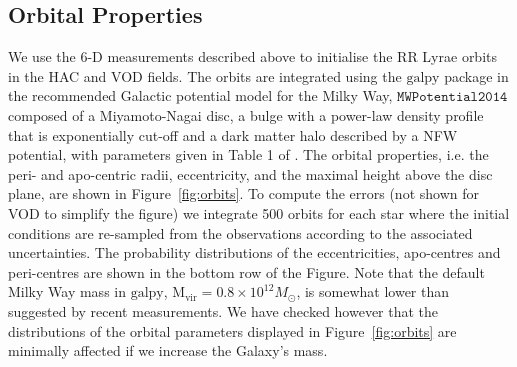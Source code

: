 \documentclass[fleqn,usenatbib]{mnras}
\begin{document}
\subsection{Orbital Properties}
We use the 6-D measurements described above to initialise the RR Lyrae
orbits in the HAC and VOD fields. The orbits are integrated using the
$\mathrm{galpy}$ package \citep{Bovy2015} in the recommended Galactic
potential model for the Milky Way, $\texttt{MWPotential2014}$ composed
of a Miyamoto-Nagai disc, a bulge with a power-law density profile
that is exponentially cut-off and a dark matter halo described by a
NFW potential, with parameters given in Table 1 of
\citet{Bovy2015}. The orbital properties, i.e. the peri- and
apo-centric radii, eccentricity, and the maximal height above the disc
plane, are shown in Figure~\ref{fig:orbits}. To compute the errors
(not shown for VOD to simplify the figure) we integrate 500 orbits for
each star where the initial conditions are re-sampled from the
observations according to the associated uncertainties. The
probability distributions of the eccentricities, apo-centres and
peri-centres are shown in the bottom row of the Figure. Note that the
default Milky Way mass in $\mathrm{galpy}$, $\mathrm{M_{vir}} = 0.8
\times 10^{12} M_{\odot}$, is somewhat lower than suggested by recent
measurements.  We have checked however that the distributions of the
orbital parameters displayed in Figure~\ref{fig:orbits} are minimally
affected if we increase the Galaxy's mass.
\end{document}
